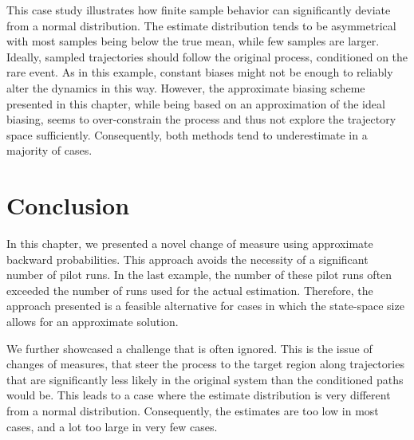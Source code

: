 This case study illustrates how finite sample behavior can
significantly deviate from a normal distribution.
The estimate distribution tends to be asymmetrical with most samples
being below the true mean, while few samples are larger.
Ideally, sampled trajectories should follow the original process,
conditioned on the rare event.
As in this example, constant biases might not be enough to reliably
alter the dynamics in this way.
However, the approximate biasing scheme presented in this chapter,
while being based on an approximation of the ideal biasing, seems to
over-constrain the process and thus not explore the trajectory space
sufficiently.
Consequently, both methods tend to underestimate in a majority of cases.

\section{Conclusion}
In this chapter, we presented a novel change of measure using
approximate backward probabilities.
This approach avoids the necessity of a significant number of pilot runs.
In the last example, the number of these pilot runs often exceeded
the number of runs used for the actual estimation.
Therefore, the approach presented is a feasible alternative for cases
in which the state-space size allows for an approximate solution.

We further showcased a challenge that is often ignored.
This is the issue of changes of measures, that steer the process to
the target region along trajectories that are significantly less
likely in the original system than the conditioned paths would be.
This leads to a case where the estimate distribution is very
different from a normal distribution.
Consequently, the estimates are too low in most cases, and a lot too
large in very few cases.

